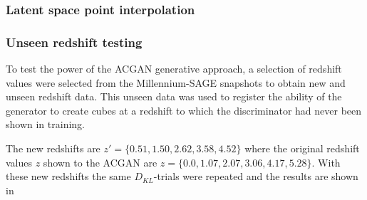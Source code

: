 \documentclass[twocolumn]{article}
\numberwithin{equation}{section}
\begin{document}




\subsubsection{Latent space point interpolation}


\subsubsection{Unseen redshift testing}
To test the power of the ACGAN generative approach, a selection of redshift values were selected from the Millennium-SAGE
snapshots to obtain new and unseen redshift data. This unseen data was used to register the ability of the generator to
create cubes at a redshift to which the discriminator had never been shown in training. 

The new redshifts are $z'=\{0.51, 1.50, 2.62, 3.58, 4.52\}$ where the original redshift values $z$ shown to the
ACGAN are $z=\{0.0, 1.07, 2.07, 3.06, 4.17, 5.28\}$. With these new redshifts the same $D_{KL}$-trials were repeated and 
the results are shown in 



\end{document}
